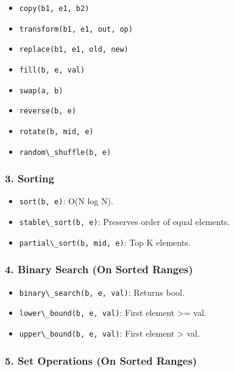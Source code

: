 \begin{itemize}
\tightlist
\item
  \passthrough{\lstinline!copy(b1, e1, b2)!}
\item
  \passthrough{\lstinline!transform(b1, e1, out, op)!}
\item
  \passthrough{\lstinline!replace(b1, e1, old, new)!}
\item
  \passthrough{\lstinline!fill(b, e, val)!}
\item
  \passthrough{\lstinline!swap(a, b)!}
\item
  \passthrough{\lstinline!reverse(b, e)!}
\item
  \passthrough{\lstinline!rotate(b, mid, e)!}
\item
  \passthrough{\lstinline!random\_shuffle(b, e)!}
\end{itemize}

\hypertarget{sorting}{%
\subsubsection{3. Sorting}\label{sorting}}

\begin{itemize}
\tightlist
\item
  \passthrough{\lstinline!sort(b, e)!}: O(N log N).
\item
  \passthrough{\lstinline!stable\_sort(b, e)!}: Preserves order of equal
  elements.
\item
  \passthrough{\lstinline!partial\_sort(b, mid, e)!}: Top K elements.
\end{itemize}

\hypertarget{binary-search-on-sorted-ranges}{%
\subsubsection{4. Binary Search (On Sorted
Ranges)}\label{binary-search-on-sorted-ranges}}

\begin{itemize}
\tightlist
\item
  \passthrough{\lstinline!binary\_search(b, e, val)!}: Returns bool.
\item
  \passthrough{\lstinline!lower\_bound(b, e, val)!}: First element
  \textgreater= val.
\item
  \passthrough{\lstinline!upper\_bound(b, e, val)!}: First element
  \textgreater{} val.
\end{itemize}

\hypertarget{set-operations-on-sorted-ranges}{%
\subsubsection{5. Set Operations (On Sorted
Ranges)}\label{set-operations-on-sorted-ranges}}

